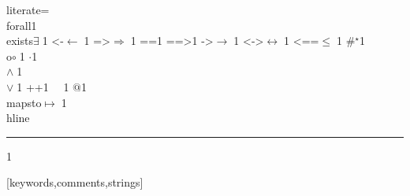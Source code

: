 {    %
    literate=
    {\\forall}{{\color{dkgreen}{$\forall\;$}}}1
    {\\exists}{{$\exists\;$}}1
    {<-}{{$\leftarrow\;$}}1
    {=>}{{$\Rightarrow\;$}}1
    {==}{{\code{==}\;}}1
    {==>}{{\code{==>}\;}}1
    {->}{{$\rightarrow\;$}}1
    {<->}{{$\leftrightarrow\;$}}1
    {<==}{{$\leq\;$}}1
    {\#}{{$^\star$}}1 
    {\\o}{{$\circ\;$}}1 
    {\@}{{$\cdot$}}1 
    {\/\\}{{$\wedge\;$}}1
    {\\\/}{{$\vee\;$}}1
    {++}{{\code{++}}}1
    {~}{{\ }}1
    {\@\@}{{$@$}}1
    {\\mapsto}{{$\mapsto\;$}}1
    {\\hline}{{\rule{\linewidth}{0.5pt}}}1
}[keywords,comments,strings]


\usepackage{ebproof}


\usepackage[breakable]{tcolorbox} %
\DeclareRobustCommand\titleforcurrentframe{temp}  %
\newcommand{\mybox}[1]{%
    \begin{tcolorbox}[
        colframe=augustablue,
        colback=white,
        width={\dimexpr\textwidth},
        breakable,
        adjusted title={\hypersetup{citecolor=white}\titleforcurrentframe}
    ]
    #1
    \end{tcolorbox}
}


\usepackage{pdfpages}
\newcommand*{\numberofpages}[1]{%
    \the\XeTeXpdfpagecount"#1" %
}

